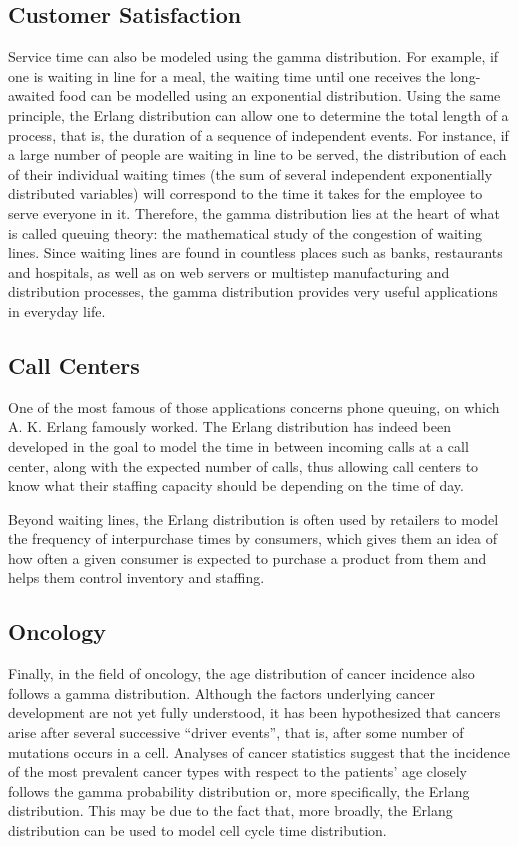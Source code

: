 \documentclass[12pt]{article}
\begin{document}
\subsection{Customer Satisfaction}
Service time can also be modeled using the gamma distribution. For example, if one is waiting in line for a meal, the
waiting time until one receives the long-awaited food can be modelled using an exponential distribution. Using the same
principle, the Erlang distribution can allow one to determine the total length of a process, that is, the duration of a
sequence of independent events. For instance, if a large number of people are waiting in line to be served, the
distribution of each of their individual waiting times (the sum of several independent exponentially distributed
variables) will correspond to the time it takes for the employee to serve everyone in it. Therefore, the gamma
distribution lies at the heart of what is called queuing theory: the mathematical study of the congestion of waiting
lines. Since waiting lines are found in countless places such as banks, restaurants and hospitals, as well as on web
servers or multistep manufacturing and distribution processes, the gamma distribution provides very useful applications
in everyday life.

\subsection{Call Centers}
One of the most famous of those applications concerns phone queuing, on which A. K. Erlang famously worked. The Erlang
distribution has indeed been developed in the goal to model the time in between incoming calls at a call center, along
with the expected number of calls, thus allowing call centers to know what their staffing capacity should be depending
on the time of day.

Beyond waiting lines, the Erlang distribution is often used by retailers to model the frequency of interpurchase times
by consumers, which gives them an idea of how often a given consumer is expected to purchase a product from them and
helps them control inventory and staffing.

\subsection{Oncology}
Finally, in the field of oncology, the age distribution of cancer incidence also follows a gamma distribution. Although
the factors underlying cancer development are not yet fully understood, it has been hypothesized that cancers arise
after several successive “driver events”, that is, after some number of mutations occurs in a cell. Analyses of cancer
statistics suggest that the incidence of the most prevalent cancer types with respect to the patients' age closely
follows the gamma probability distribution or, more specifically, the Erlang distribution. This may be due to the fact
that, more broadly, the Erlang distribution can be used to model cell cycle time
distribution\cite{belikovNumberKeyCarcinogenic2017}.
\end{document}
